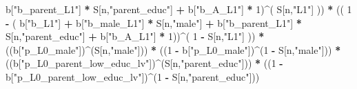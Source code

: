 \documentclass[
]{book}
\newenvironment{Shaded}{\begin{snugshade}}{\end{snugshade}}
\newcommand{\DecValTok}[1]{\textcolor[rgb]{0.00,0.00,0.81}{#1}}
\newcommand{\NormalTok}[1]{#1}
\newcommand{\SpecialCharTok}[1]{\textcolor[rgb]{0.81,0.36,0.00}{\textbf{#1}}}
\newcommand{\StringTok}[1]{\textcolor[rgb]{0.31,0.60,0.02}{#1}}
\begin{document}
\begin{Shaded}
\begin{Highlighting}[]
\NormalTok{           b[}\StringTok{"b\_parent\_L1"}\NormalTok{] }\SpecialCharTok{*}\NormalTok{ S[n,}\StringTok{"parent\_educ"}\NormalTok{] }\SpecialCharTok{+}
\NormalTok{           b[}\StringTok{"b\_A\_L1"}\NormalTok{] }\SpecialCharTok{*} \DecValTok{1}\NormalTok{)}\SpecialCharTok{\^{}}\NormalTok{( S[n,}\StringTok{"L1"}\NormalTok{] )) }\SpecialCharTok{*}
\NormalTok{      (( }\DecValTok{1} \SpecialCharTok{{-}}\NormalTok{ ( b[}\StringTok{"b\_L1"}\NormalTok{] }\SpecialCharTok{+}
\NormalTok{                 b[}\StringTok{"b\_male\_L1"}\NormalTok{] }\SpecialCharTok{*}\NormalTok{ S[n,}\StringTok{"male"}\NormalTok{] }\SpecialCharTok{+}  
\NormalTok{                 b[}\StringTok{"b\_parent\_L1"}\NormalTok{] }\SpecialCharTok{*}\NormalTok{ S[n,}\StringTok{"parent\_educ"}\NormalTok{] }\SpecialCharTok{+}
\NormalTok{                 b[}\StringTok{"b\_A\_L1"}\NormalTok{] }\SpecialCharTok{*} \DecValTok{1}\NormalTok{))}\SpecialCharTok{\^{}}\NormalTok{( }\DecValTok{1} \SpecialCharTok{{-}}\NormalTok{ S[n,}\StringTok{"L1"}\NormalTok{] )) }\SpecialCharTok{*}
\NormalTok{      ((b[}\StringTok{"p\_L0\_male"}\NormalTok{])}\SpecialCharTok{\^{}}\NormalTok{(S[n,}\StringTok{"male"}\NormalTok{])) }\SpecialCharTok{*} 
\NormalTok{      ((}\DecValTok{1} \SpecialCharTok{{-}}\NormalTok{ b[}\StringTok{"p\_L0\_male"}\NormalTok{])}\SpecialCharTok{\^{}}\NormalTok{(}\DecValTok{1} \SpecialCharTok{{-}}\NormalTok{ S[n,}\StringTok{"male"}\NormalTok{])) }\SpecialCharTok{*} 
\NormalTok{      ((b[}\StringTok{"p\_L0\_parent\_low\_educ\_lv"}\NormalTok{])}\SpecialCharTok{\^{}}\NormalTok{(S[n,}\StringTok{"parent\_educ"}\NormalTok{])) }\SpecialCharTok{*}
\NormalTok{      ((}\DecValTok{1} \SpecialCharTok{{-}}\NormalTok{ b[}\StringTok{"p\_L0\_parent\_low\_educ\_lv"}\NormalTok{])}\SpecialCharTok{\^{}}\NormalTok{(}\DecValTok{1} \SpecialCharTok{{-}}\NormalTok{ S[n,}\StringTok{"parent\_educ"}\NormalTok{])) }
    

\end{Highlighting}
\end{Shaded}
\end{document}
